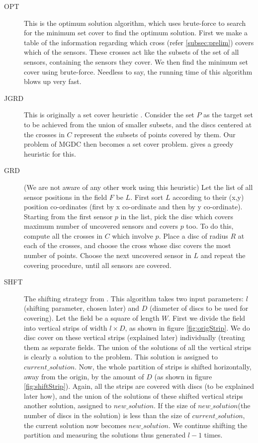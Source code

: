 \begin{description}

\item[OPT] This is the optimum solution algorithm, which uses brute-force to search for the minimum set cover to find the optimum solution. First we make a table of the information regarding which cross (refer \ref{subsec:prelim}) covers which of the sensors. These crosses act like the subsets of the set of all sensors, containing the sensors they cover. We then find the minimum set cover using brute-force. Needless to say, the running time of this algorithm blows up very fast.

\item[JGRD] This is originally a set cover heuristic \cite{jgreedy}. Consider the set $P$ as the target set to be achieved from the union of smaller subsets, and the discs centered at the crosses in $C$ represent the subsets of points covered by them. Our problem of MGDC then becomes a set cover problem. \cite{jgreedy} gives a greedy heuristic for this.

\item[GRD] (We are not aware of any other work using this heuristic) Let the list of all sensor positions in the field $F$ be $L$. First sort $L$ according to their (x,y) position co-ordinates (first by x co-ordinate and then by y co-ordinate). Starting from the first sensor $p$ in the list, pick the disc which covers maximum number of uncovered sensors and covers $p$ too. To do this, compute all the crosses in $C$ which involve $p$. Place a disc of radius $R$ at each of the crosses, and choose the cross whose disc covers the most number of points. Choose the next uncovered sensor in $L$ and repeat the covering procedure, until all sensors are covered.

\item[SHFT] The shifting strategy from \cite{shifting}. This algorithm takes two input parameters: $l$ (shifting parameter, chosen later) and $D$ (diameter of discs to be used for covering). Let the field be a square of length $W$. First we divide the field into vertical strips of width $l \times D$, as shown in figure \ref{fig:origStrip}. We do disc cover on these vertical strips (explained later) individually (treating them as separate fields. The union of the solutions of all the vertical strips is clearly a solution to the problem. This solution is assigned to $current\_solution$. Now, the whole partition of strips is shifted horizontally, away from the origin, by the amount of $D$ (as shown in figure \ref{fig:shiftStrip}). Again, all the strips are covered with discs (to be explained later how), and the union of the solutions of these shifted vertical strips another solution, assigned to $new\_solution$. If the size of $new\_solution$(the number of discs in the solution) is less than the size of $current\_solution$, the current solution now becomes $new\_solution$. We continue shifting the partition and measuring the solutions thus generated $l-1$ times.


\end{description}
